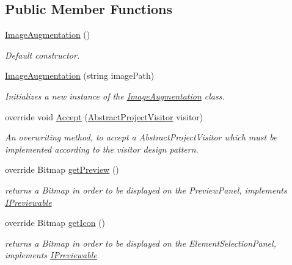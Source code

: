 \subsection*{Public Member Functions}
\begin{DoxyCompactItemize}
\item 
\hyperlink{class_a_rdev_kit_1_1_model_1_1_project_1_1_image_augmentation_a7ef7e1f296fa9ad472fe601d7ab3c4d1}{Image\-Augmentation} ()
\begin{DoxyCompactList}\small\item\em Default constructor. \end{DoxyCompactList}\item 
\hyperlink{class_a_rdev_kit_1_1_model_1_1_project_1_1_image_augmentation_afb556b0cb19bd252c7edcd948c26ea28}{Image\-Augmentation} (string image\-Path)
\begin{DoxyCompactList}\small\item\em Initializes a new instance of the \hyperlink{class_a_rdev_kit_1_1_model_1_1_project_1_1_image_augmentation}{Image\-Augmentation} class. \end{DoxyCompactList}\item 
override void \hyperlink{class_a_rdev_kit_1_1_model_1_1_project_1_1_image_augmentation_a1450cf89881f65c8882126914379ae50}{Accept} (\hyperlink{class_a_rdev_kit_1_1_controller_1_1_project_controller_1_1_abstract_project_visitor}{Abstract\-Project\-Visitor} visitor)
\begin{DoxyCompactList}\small\item\em An overwriting method, to accept a Abstract\-Project\-Visitor which must be implemented according to the visitor design pattern. \end{DoxyCompactList}\item 
override Bitmap \hyperlink{class_a_rdev_kit_1_1_model_1_1_project_1_1_image_augmentation_a76230c0eb40c317bab23b37c27ea3a39}{get\-Preview} ()
\begin{DoxyCompactList}\small\item\em returns a Bitmap in order to be displayed on the Preview\-Panel, implements \hyperlink{interface_a_rdev_kit_1_1_model_1_1_project_1_1_i_previewable}{I\-Previewable} \end{DoxyCompactList}\item 
override Bitmap \hyperlink{class_a_rdev_kit_1_1_model_1_1_project_1_1_image_augmentation_a7f1d0335a2559d461cbe18599ce472c2}{get\-Icon} ()
\begin{DoxyCompactList}\small\item\em returns a Bitmap in order to be displayed on the Element\-Selection\-Panel, implements \hyperlink{interface_a_rdev_kit_1_1_model_1_1_project_1_1_i_previewable}{I\-Previewable} \end{DoxyCompactList}\item 

\end{DoxyCompactItemize}
